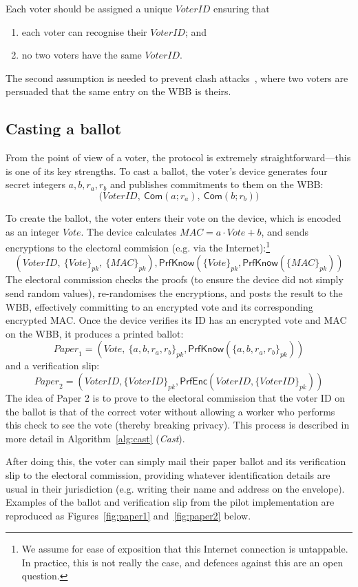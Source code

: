 \documentclass[12pt,a4paper]{article}
\newcommand{\commit}{\mathsf{Com}}
\newcommand{\PrfEnc}{\mathsf{PrfEnc}}
\newcommand{\PrfKnow}{\mathsf{PrfKnow}}
\theoremstyle{definition}
\newcommand{\Vote}{\mathit{Vote}}
\newcommand{\VoterID}{\mathit{VoterID}}
\newcommand{\Paper}{\mathit{Paper}}
\newcommand{\Mac}{\mathit{MAC}}
\begin{document}
Each voter should be assigned a unique $\VoterID$ ensuring that
\begin{enumerate}
    \item each voter can recognise their $\VoterID$; and
    \item no two voters have the same $\VoterID$.
\end{enumerate}
The second assumption is needed to prevent clash attacks~\cite{kusters2012clash}, where two voters are persuaded that the same entry on the WBB is theirs.

\subsection{Casting a ballot}
From the point of view of a voter, the protocol is extremely straightforward---this is one of its key strengths. To cast a ballot, the voter's device generates four secret integers $a, b, r_a, r_b$ and publishes commitments to them on the WBB:
$$\big(\VoterID,\ \commit(a;r_a),\ \commit(b;r_b)\big)$$

To create the ballot, the voter enters their vote on the device, which is encoded as an integer $\Vote$. The device calculates $\Mac=a\cdot \Vote+b$, and sends encryptions to the electoral commision (e.g. via the Internet):\footnote{We assume for ease of exposition that this Internet connection is untappable. In practice, this is not really the case, and defences against this are an open question.}
$$\left(\VoterID,\ \{\Vote\}_{pk},\ \{\Mac\}_{pk}\right), \PrfKnow(\{\Vote\}_{pk}, \PrfKnow(\{\Mac\}_{pk}))$$
The electoral commission checks the proofs (to ensure the device did not simply send random values), re-randomises the encryptions, and posts the result to the WBB, effectively committing to an encrypted vote and its corresponding encrypted MAC. Once the device verifies its ID has an encrypted vote and MAC on the WBB, it produces a printed ballot:
$$\Paper_1 = \left(\Vote,\ \{a,b,r_a,r_b\}_{pk}, \PrfKnow(\{a,b,r_a,r_b\}_{pk})\right)$$
and a verification slip:
$$\Paper_2 = \left(\VoterID, \{\VoterID\}_{pk}, \PrfEnc(\VoterID, \{\VoterID\}_{pk})\right)$$
The idea of Paper 2 is to prove to the electoral commission that the voter ID on the ballot is that of the correct voter without allowing a worker who performs this check to see the vote (thereby breaking privacy). This process is described in more detail in Algorithm~\ref{alg:cast} (\textit{Cast}).

After doing this, the voter can simply mail their paper ballot and its verification slip to the electoral commission, providing whatever identification details are usual in their jurisdiction (e.g. writing their name and address on the envelope). Examples of the ballot and verification slip from the pilot implementation are reproduced as Figures~\ref{fig:paper1} and~\ref{fig:paper2} below.
\end{document}
